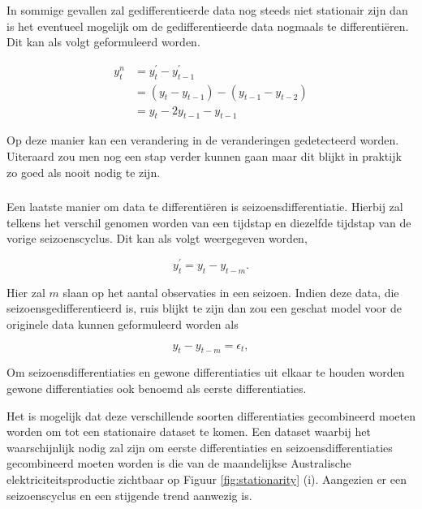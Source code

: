 \subsubsection{}

In sommige gevallen zal gedifferentieerde data nog steeds niet stationair zijn dan is het eventueel mogelijk om de gedifferentieerde data nogmaals te differenti\"{e}ren. Dit kan als volgt geformuleerd worden.

\begin{equation}
\begin{aligned}
y_t^n {} & = y^\prime_t - y^\prime_{t-1}  \\
& = (y_t - y_{t-1}) - (y_{t-1} - y_{t-2})\\
& = y_t - 2y_{t-1} - y_{t-1}
\end{aligned}
\end{equation}

Op deze manier kan een verandering in de veranderingen gedetecteerd worden. Uiteraard zou men nog een stap verder kunnen gaan maar dit blijkt in praktijk zo goed als nooit nodig te zijn.

\subsubsection{}
Een laatste manier om data te differenti\"{e}ren is seizoensdifferentiatie. Hierbij zal telkens het verschil genomen worden van een tijdstap en diezelfde tijdstap van de vorige seizoenscyclus. Dit kan als volgt weergegeven worden,

\begin{equation}
y_t^\prime = y_t - y_{t-m}.
\end{equation}

Hier zal $m$ slaan op het aantal observaties in een seizoen. Indien deze data, die seizoensgedifferentieerd is, ruis blijkt te zijn dan zou een geschat model voor de originele data kunnen geformuleerd worden als

 \begin{equation}
y_t - y_{t-m} = \epsilon_t,
 \end{equation}

Om seizoensdifferentiaties en gewone differentiaties uit elkaar te houden worden gewone differentiaties ook benoemd als eerste differentiaties. 

Het is mogelijk dat deze verschillende soorten differentiaties gecombineerd moeten worden om tot een stationaire dataset te komen. Een dataset waarbij het waarschijnlijk nodig zal zijn om eerste differentiaties en seizoensdifferentiaties gecombineerd moeten worden is die van de maandelijkse Australische elektriciteitsproductie zichtbaar op Figuur \ref{fig:stationarity} (i). Aangezien er een seizoenscyclus en een stijgende trend aanwezig is.

